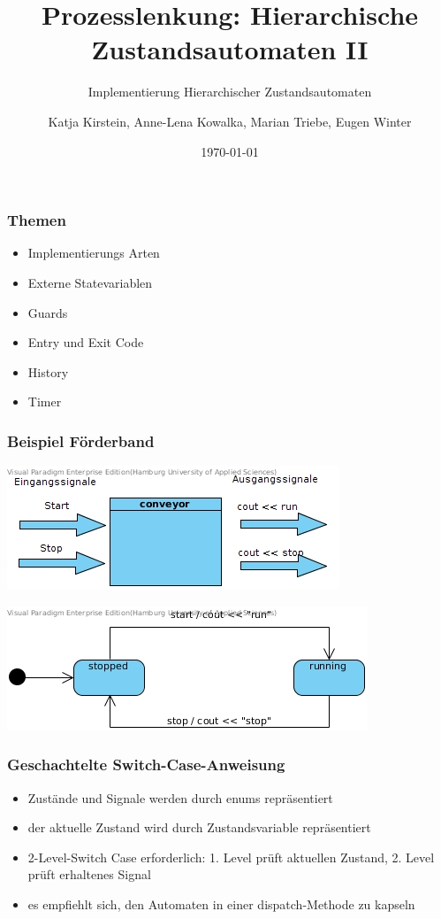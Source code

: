 \documentclass{beamer}
\title{Prozesslenkung: Hierarchische Zustandsautomaten II}
\subtitle{Implementierung Hierarchischer Zustandsautomaten}
\author{Katja Kirstein, Anne-Lena Kowalka, Marian Triebe, Eugen Winter}
\date{\today}
\begin{document}
\begin{frame}
 \titlepage
\end{frame}

\begin{frame}
 \frametitle{Themen}
 \begin{itemize}
  \item Implementierungs Arten
  \item Externe Statevariablen
  \item Guards
  \item Entry und Exit Code
  \item History
  \item Timer
 \end{itemize}
\end{frame}

\begin{frame}
 \frametitle{Beispiel F\"orderband}
 \begin{center}
   \includegraphics[scale=.5]{img/Systemgrenzen_fsm_gof.jpg}
   \newline
  \end{center}
  \includegraphics[scale=.6]{img/fsm_gof_automat.jpg}
\end{frame}

\begin{frame}
  \frametitle{Geschachtelte Switch-Case-Anweisung}
  \begin{itemize}
    \item Zust\"ande und Signale werden durch enums repr\"asentiert
    \item der aktuelle Zustand wird durch Zustandsvariable repr\"asentiert
    \item 2-Level-Switch Case erforderlich: 1. Level pr\"uft aktuellen Zustand,
    2. Level pr\"uft erhaltenes Signal
    \item es empfiehlt sich, den Automaten in einer dispatch-Methode zu kapseln
  \end{itemize}
\end{frame}
\end{document}

